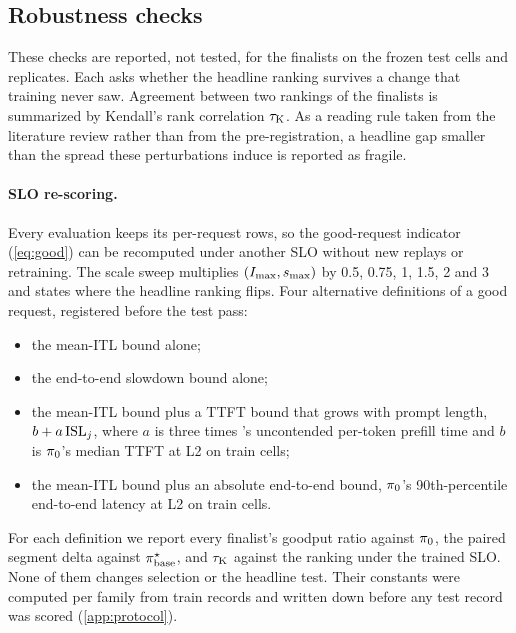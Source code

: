 \subsection{Robustness checks}
\label{sec:robustness}

These checks are reported, not tested, for the finalists on the frozen test cells and replicates.
Each asks whether the headline ranking survives a change that training never saw. Agreement between
two rankings of the finalists is summarized by Kendall's rank correlation $\tau_{\mathrm{K}}$. As a reading
rule taken from the literature review rather than from the pre-registration, a headline gap smaller
than the spread these perturbations induce is reported as fragile.

\paragraph{SLO re-scoring.}
Every evaluation keeps its per-request rows, so the good-request indicator (\cref{eq:good}) can be
recomputed under another SLO without new replays or retraining. The scale sweep multiplies
$(I_{\max}, s_{\max})$ by 0.5, 0.75, 1, 1.5, 2 and 3 and states where the headline ranking flips.
Four alternative definitions of a good request, registered before the test pass:
\begin{itemize}
  \item the mean-ITL bound alone;
  \item the end-to-end slowdown bound alone;
  \item the mean-ITL bound plus a TTFT bound that grows with prompt length, $b + a\,\mathrm{ISL}_j$, where
    $a$ is three times \ais{}'s uncontended per-token prefill time and $b$ is $\pi_{0}$'s median TTFT
    at L2 on train cells;
  \item the mean-ITL bound plus an absolute end-to-end bound, $\pi_{0}$'s 90th-percentile end-to-end
    latency at L2 on train cells.
\end{itemize}
For each definition we report every finalist's goodput ratio against $\pi_{0}$, the paired
segment delta against $\pi^{\star}_{\mathrm{base}}$, and $\tau_{\mathrm{K}}$ against the ranking under the trained SLO. None of
them changes selection or the headline test. Their constants were computed per family from train
records and written down before any test record was scored (\cref{app:protocol}).

